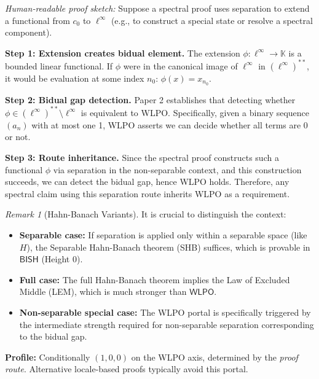 \documentclass[11pt]{article}
\newcommand{\WLPO}{\mathsf{WLPO}}
\theoremstyle{plain}
\theoremstyle{definition}
\theoremstyle{remark}
\newtheorem{remark}[theorem]{Remark}
\newenvironment{hrproof}{\noindent\textit{Human-readable proof sketch:} }{}
\newcommand{\BISH}{\mathsf{BISH}}
\begin{document}
\begin{hrproof}
Suppose a spectral proof uses separation to extend a functional from $c_0$ to $\ell^\infty$ (e.g., to construct a special state or resolve a spectral component). 

\textbf{Step 1: Extension creates bidual element.}
The extension $\phi: \ell^\infty \to \mathbb{K}$ is a bounded linear functional. If $\phi$ were in the canonical image of $\ell^\infty$ in $(\ell^\infty)^{**}$, it would be evaluation at some index $n_0$: $\phi(x) = x_{n_0}$.

\textbf{Step 2: Bidual gap detection.}
Paper 2 establishes that detecting whether $\phi \in (\ell^\infty)^{**} \setminus \ell^\infty$ is equivalent to WLPO. 
Specifically, given a binary sequence $(a_n)$ with at most one 1, WLPO asserts we can decide whether all terms are 0 or not.

\textbf{Step 3: Route inheritance.}
Since the spectral proof constructs such a functional $\phi$ via separation in the non-separable context, 
and this construction succeeds, we can detect the bidual gap, hence WLPO holds.
Therefore, any spectral claim using this separation route inherits WLPO as a requirement.
\end{hrproof}

\begin{remark}[Hahn-Banach Variants]
It is crucial to distinguish the context:
\begin{itemize}
\item \textbf{Separable case:} If separation is applied only within a separable space (like $H$), the Separable Hahn-Banach theorem (SHB) suffices, which is provable in $\BISH$ (Height 0). 
\item \textbf{Full case:} The full Hahn-Banach theorem implies the Law of Excluded Middle (LEM), which is much stronger than $\WLPO$.
\item \textbf{Non-separable special case:} The WLPO portal is specifically triggered by the intermediate strength required for non-separable separation corresponding to the bidual gap.
\end{itemize}
\end{remark}

\noindent\textbf{Profile:} Conditionally $(1,0,0)$ on the WLPO axis, determined by the \emph{proof route}. Alternative locale-based proofs typically avoid this portal.
\end{document}
